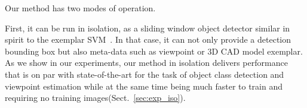 % 
% 
% 
% 
% 
% 


Our method has two modes of operation.

First, it can be run in isolation, as a sliding window object
detector similar in spirit to the exemplar SVM~\cite{Malisiewicz11}. In
that case, it can not only provide a detection bounding box but also
meta-data such as viewpoint or 3D CAD model exemplar.
As we show in our experiments, our method in isolation delivers
performance that is on par with state-of-the-art for the task of
object class detection and viewpoint estimation while at the same time
being much faster to train and requiring no training images(Sect.~\ref{sec:exp_iso}).


